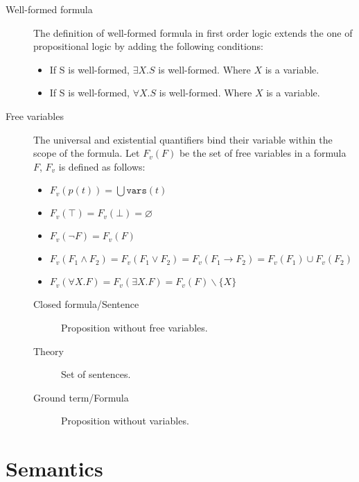 \begin{description}
    \item[Well-formed formula] 
        The definition of well-formed formula in first order logic extends the one of
        propositional logic by adding the following conditions:
        \begin{itemize}
            \item If S is well-formed, $\exists X. S$ is well-formed. Where $X$ is a variable.
            \item If S is well-formed, $\forall X. S$ is well-formed. Where $X$ is a variable.
        \end{itemize}

    \item[Free variables] 
        The universal and existential quantifiers bind their variable within the scope of the formula.
        Let $F_v(F)$ be the set of free variables in a formula $F$, $F_v$ is defined as follows:
        \begin{itemize}
            \item $F_v(p(t)) = \bigcup \texttt{vars}(t)$
            \item $F_v(\top) = F_v(\bot) = \varnothing$
            \item $F_v(\lnot F) = F_v(F)$
            \item $F_v(F_1 \land F_2) = F_v(F_1 \vee  F_2) = F_v(F_1 \rightarrow F_2) = F_v(F_1) \cup F_v(F_2)$
            \item $F_v(\forall X.F) = F_v(\exists X.F) = F_v(F) \smallsetminus \{ X \}$
        \end{itemize}

        \begin{description}
            \item[Closed formula/Sentence] 
                Proposition without free variables.
            
            \item[Theory] 
                Set of sentences.

            \item[Ground term/Formula] 
                Proposition without variables.
        \end{description}
\end{description}



\section{Semantics}

